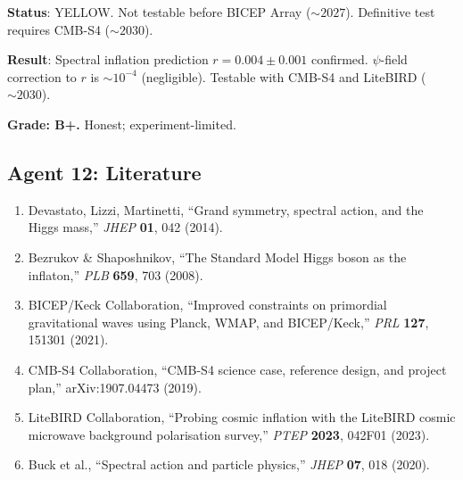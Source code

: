 \documentclass[11pt,a4paper]{article}
\begin{document}
\textbf{Status}: YELLOW. Not testable before BICEP Array ($\sim 2027$). Definitive test requires CMB-S4 ($\sim 2030$).

\begin{tcolorbox}[colback=yellow!5!white, colframe=yellow!60!black, title={Agent 12: $B$-Mode $r = 0.004$ --- Remains YELLOW}]
\textbf{Result}: Spectral inflation prediction $r = 0.004 \pm 0.001$ confirmed. $\psi$-field correction to $r$ is $\sim 10^{-4}$ (negligible). Testable with CMB-S4 and LiteBIRD ($\sim 2030$).

\textbf{Grade: B+.} Honest; experiment-limited.
\end{tcolorbox}

\subsection{Agent 12: Literature}

\begin{enumerate}
\item Devastato, Lizzi, Martinetti, ``Grand symmetry, spectral action, and the Higgs mass,'' \textit{JHEP} \textbf{01}, 042 (2014).
\item Bezrukov \& Shaposhnikov, ``The Standard Model Higgs boson as the inflaton,'' \textit{PLB} \textbf{659}, 703 (2008).
\item BICEP/Keck Collaboration, ``Improved constraints on primordial gravitational waves using Planck, WMAP, and BICEP/Keck,'' \textit{PRL} \textbf{127}, 151301 (2021).
\item CMB-S4 Collaboration, ``CMB-S4 science case, reference design, and project plan,'' arXiv:1907.04473 (2019).
\item LiteBIRD Collaboration, ``Probing cosmic inflation with the LiteBIRD cosmic microwave background polarisation survey,'' \textit{PTEP} \textbf{2023}, 042F01 (2023).
\item Buck et al., ``Spectral action and particle physics,'' \textit{JHEP} \textbf{07}, 018 (2020).
\end{enumerate}
\end{document}
